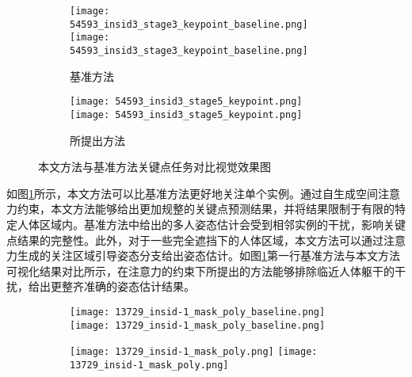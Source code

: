 \begin{outstandingabstract}
\begin{figure}[H]
\begin{minipage}{\linewidth}
    		\vskip5pt
    		\begin{subfigure}[b]{0.45\linewidth}
    			\centering
    			\begin{minipage}{\linewidth}
    				\texttt{[image: 54593\_insid3\_stage3\_keypoint\_baseline.png]}
    				{\texttt{[image: 54593\_insid3\_stage3\_keypoint\_baseline.png]}}
    			\end{minipage}
    			\caption{基准方法\cite{wei2016convolutional}}
    		\end{subfigure}
    		\begin{subfigure}[b]{0.45\linewidth}
    			\centering
    			\begin{minipage}{\linewidth}
    				\texttt{[image: 54593\_insid3\_stage5\_keypoint.png]}
    				{\texttt{[image: 54593\_insid3\_stage5\_keypoint.png]}}
    			\end{minipage}
    			\caption{所提出方法}
    		\end{subfigure}
    	\end{minipage}
    	\caption{本文方法与基准方法关键点任务对比视觉效果图}
    	\label{fig:comparison_keypoint}
    \end{figure}
	如图\ref{fig:comparison_keypoint}所示，本文方法可以比基准方法更好地关注单个实例。通过自生成空间注意力约束，本文方法能够给出更加规整的关键点预测结果，并将结果限制于有限的特定人体区域内。基准方法中给出的多人姿态估计会受到相邻实例的干扰，影响关键点结果的完整性。此外，对于一些完全遮挡下的人体区域，本文方法可以通过注意力生成的关注区域引导姿态分支给出姿态估计。如图\ref{fig:comparison_keypoint}第一行基准方法与本文方法可视化结果对比所示，在注意力的约束下所提出的方法能够排除临近人体躯干的干扰，给出更整齐准确的姿态估计结果。
	
	\begin{figure}[H]
		\centering
		\begin{minipage}{\linewidth}
			\centering
			\begin{subfigure}[b]{0.45\linewidth}
				\begin{minipage}{\linewidth}
					\centering
					\texttt{[image: 13729\_insid-1\_mask\_poly\_baseline.png]}
					{\texttt{[image: 13729\_insid-1\_mask\_poly\_baseline.png]}}
				\end{minipage}
			\end{subfigure}
			\begin{subfigure}[b]{0.45\linewidth}
				\begin{minipage}{\linewidth}
					\centering
					\texttt{[image: 13729\_insid-1\_mask\_poly.png]}
					{\texttt{[image: 13729\_insid-1\_mask\_poly.png]}}
				\end{minipage}
			\end{subfigure}
			

\end{minipage}
\end{figure}
\end{outstandingabstract}
